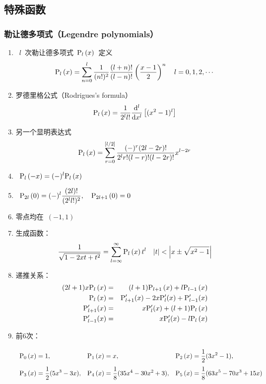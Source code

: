 \documentclass[12pt,a4paper]{article}
\newcommand\dif{\mathrm{d}}
\renewcommand{\[}{\ $\displaystyle}
\renewcommand{\]}{$\ }%
\newcommand{\summ}[2][n]{\sum_{#1=#2}^\infty}
\begin{document}
	\subsection{特殊函数}
	  \subsubsection{勒让德多项式（Legendre polynomials）}
		\begin{enumerate}
			\item \[l\]次勒让德多项式\[\fp{x}\]定义
			$$
		 	  \fp{x} = \sum_{n=0}^l \frac{1}{(n!)^2}\frac{(l+n)!}{(l-n)!}\left(\frac{x-1}2\right)^n \quad l = 0,1,2,\cdots
		 	$$
		 	\item 罗德里格公式（Rodrigues's formula）
		 	$$
		 	  \fp{x} = \frac{1}{2^l l!}\frac{\dif^l}{\dif x^l}\left[(x^2 - 1)^l\right]
		 	$$
		 	\item 另一个显明表达式
		 	$$
		 	  \fp{x} = \sum_{r=0}^{[l/2]}\frac{(-)^r(2l-2r)!}{2^lr!(l-r)!(l-2r)!}x^{l-2r}
		 	$$
		 	\item \[\fp{-x} =(-)^l\fp{x}\]
		 	\item \[\fp[2l]{0} = (-)^l\frac{(2l)!}{(2^l l!)^2},\quad \fp[2l+1]{0} = 0\]
		 	\item 零点均在\[(-1,1)\]
		 	\item 生成函数：
		 		$$
		 		  \frac{1}{\sqrt{1 - 2xt + t^2}} = \summ[l]{\infty} \fp{x}t^l \quad |t|<\left| x \pm \sqrt{x^2 -1}\right|
		 		$$
		 	\item 递推关系：
		 		\begin{eqnarray*}
		 		  (2l+1)x\fp{x} &=& (l+1)\fp[l+1]{x} + l\fp[l-1]{x} \\
		 		  \fp[l]{x} &=& \mathrm{P}'_{l+1}(x) - 2x\mathrm{P}'_{l}(x) + \mathrm{P}'_{l-1}(x) \\
		 		  \mathrm{P}'_{l+1}(x) &=& x\mathrm{P}'_{l}(x) + (l+1)\fp{x} \\
		 		  \mathrm{P}'_{l-1}(x) &=& x\mathrm{P}'_{l}(x) - l\fp{x}
		 		\end{eqnarray*}
		 	\item 前6次：
		 		$$
		 		  \begin{array}{*{3}{>{\rule{0em}{2em}\displaystyle }l}}
		 		  \fp[0]{x} = 1,	&\fp[1]{x} = x,	&\fp[2]{x} = \frac{1}{2}(3x^2 - 1), \\
		 		  \fp[3]{x} = \frac 12(5x^3-3x),	&\fp[4]{x} =\frac 18 (35x^4 - 30x^2 + 3),	&\fp[5]{x} = \frac 18 (63x^5 - 70x^3 + 15x) 
		 		  \end{array}
		 		$$
		\end{enumerate}
		
\end{document}
